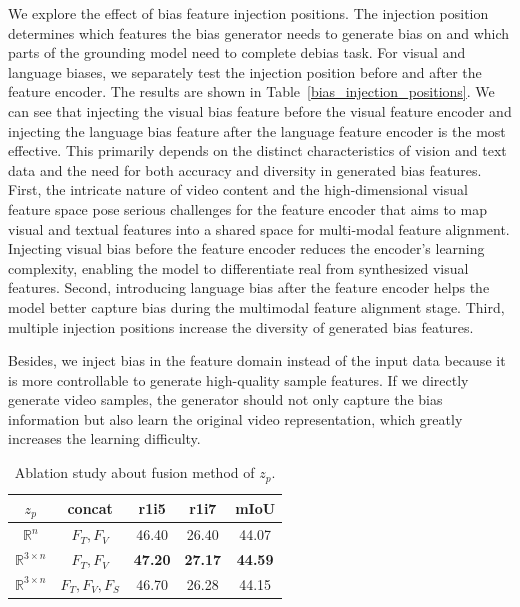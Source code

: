 We explore the effect of bias feature injection positions. 
The injection position determines which features the bias generator needs to generate bias on and which parts of the grounding model need to complete debias task. 
For visual and language biases, we separately test the injection position before and after the feature encoder. The results are shown in Table~\ref{bias_injection_positions}. 
We can see that injecting the visual bias feature before the visual feature encoder and injecting the language bias feature after the language feature encoder is the most effective. 
This primarily depends on the distinct characteristics of vision and text data and the need for both accuracy and diversity in generated bias features. First, the intricate nature of video content
and the high-dimensional visual feature space pose serious challenges for the feature encoder that aims to map visual and textual features into a shared space for multi-modal feature alignment. Injecting visual bias before the feature encoder reduces the encoder’s learning complexity, enabling the model to differentiate real from synthesized visual features. Second, introducing language bias after the feature encoder helps the model better capture bias during the multimodal feature alignment stage. Third, multiple injection positions increase the diversity of generated bias features. 

Besides, we inject bias in the feature domain instead of the input data because it is more controllable to generate high-quality sample features. If we directly generate video samples, the generator should not only capture the bias information but also learn the original video representation, which greatly increases the learning difficulty. %


\begin{table}[t]
	\centering
	\renewcommand{\arraystretch}{1}
	\begin{tabular}{c c c c c}
		\toprule
		$z_p$ & concat & r1i5 & r1i7 & mIoU\\
		\midrule
		$\mathbb{R}^{n}$ & $F_T,F_V$ & 46.40 & 26.40 & 44.07 \\
		
		$\mathbb{R}^{3 \times n}$ & $F_T,F_V$ & {\bf 47.20} & {\bf 27.17} & {\bf 44.59}\\
		
		$\mathbb{R}^{3 \times n}$ & $F_T,F_V,F_S$ & 46.70 & 26.28 & 44.15 \\
		
		\bottomrule
	\end{tabular}
	\caption{Ablation study about fusion method of $z_p$.}
	\label{fusion method}
\end{table}


